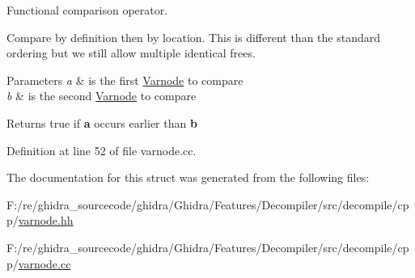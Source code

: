 Functional comparison operator. 

Compare by definition then by location. This is different than the standard ordering but we still allow multiple identical frees. 
\begin{DoxyParams}{Parameters}
{\em a} & is the first \mbox{\hyperlink{class_varnode}{Varnode}} to compare \\
\hline
{\em b} & is the second \mbox{\hyperlink{class_varnode}{Varnode}} to compare \\
\hline
\end{DoxyParams}
\begin{DoxyReturn}{Returns}
true if {\bfseries{a}} occurs earlier than {\bfseries{b}} 
\end{DoxyReturn}


Definition at line 52 of file varnode.\+cc.



The documentation for this struct was generated from the following files\+:\begin{DoxyCompactItemize}
\item 
F\+:/re/ghidra\+\_\+sourcecode/ghidra/\+Ghidra/\+Features/\+Decompiler/src/decompile/cpp/\mbox{\hyperlink{varnode_8hh}{varnode.\+hh}}\item 
F\+:/re/ghidra\+\_\+sourcecode/ghidra/\+Ghidra/\+Features/\+Decompiler/src/decompile/cpp/\mbox{\hyperlink{varnode_8cc}{varnode.\+cc}}\end{DoxyCompactItemize}
